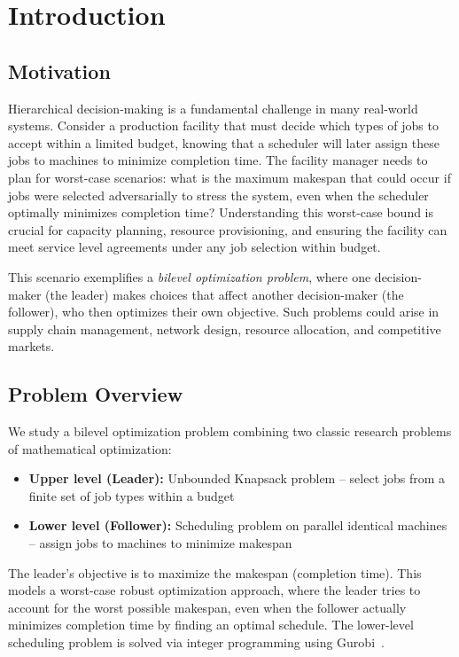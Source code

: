 \chapter{Introduction}
\label{sec:introduction}


\section{Motivation}

Hierarchical decision-making is a fundamental challenge in many real-world systems. Consider a production facility that must decide which types of jobs to accept within a limited budget, knowing that a scheduler will later assign these jobs to machines to minimize completion time. The facility manager needs to plan for worst-case scenarios: what is the maximum makespan that could occur if jobs were selected adversarially to stress the system, even when the scheduler optimally minimizes completion time? Understanding this worst-case bound is crucial for capacity planning, resource provisioning, and ensuring the facility can meet service level agreements under any job selection within budget.

This scenario exemplifies a \emph{bilevel optimization problem}, where one decision-maker (the leader) makes choices that affect another decision-maker (the follower), who then optimizes their own objective. Such problems could arise in supply chain management, network design, resource allocation, and competitive markets.

\section{Problem Overview}

We study a bilevel optimization problem combining two classic research problems of mathematical optimization:
\begin{itemize}
    \item \textbf{Upper level (Leader):} Unbounded Knapsack problem -- select jobs from a finite set of job types within a budget
    \item \textbf{Lower level (Follower):} Scheduling problem on parallel identical machines -- assign jobs to machines to minimize makespan
\end{itemize}

The leader's objective is to maximize the makespan (completion time).
This models a worst-case robust optimization approach, where the leader tries to account for the worst possible makespan,
 even when the follower actually minimizes completion time by finding an optimal schedule. The lower-level scheduling problem is solved via integer programming using Gurobi~\cite{gurobi}.

